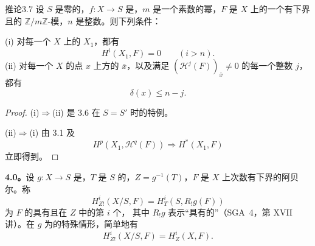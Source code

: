 \begin{SGAresult}{推论}{3.7}
设 $S$ 是零的，$f:X\to S$ 是，$m$ 是一个素数的幂，$F$ 是 $X$ 上的一个有下界且的 $\mathbb Z/m\mathbb Z$-模，$n$ 是整数。则下列条件：

(i) 对每一个 $X$ 上的 $X_1$，都有
\[
H^i(X_1,F)=0\qquad(i>n).
\]
(ii) 对每一个 $X$ 的点 $x$ 上方的 $\bar x$，以及满足 $(\mathcal H^j(F))_{\bar x}\ne0$ 的每一个整数 $j$，都有
\[
\delta(x)\leq n-j.
\]
\end{SGAresult}
\begin{proof}
(i)$\Rightarrow$(ii) 是 3.6 在 $S=S'$ 时的特例。

(ii)$\Rightarrow$(i) 由 3.1 及
\[
H^p(X_1,\mathcal H^q(F))\Longrightarrow H^*(X_1,F)
\]
立即得到。
\end{proof}

\textbf{4.0。}设 $g:X\to S$ 是，$T$ 是 $S$ 的，$Z=g^{-1}(T)$，$F$ 是 $X$ 上次数有下界的阿贝尔。称
\[
H^i_{Z!}(X/S,F)=H^i_T(S,R_!g(F))
\]
为 $F$ 的具有且在 $Z$ 中的第 $i$ 个，
其中 $R_!g$ 表示“具有的”（SGA~4，第 XVII 讲）。在 $g$ 为的特殊情形，简单地有
\[
H^i_{Z!}(X/S,F)=H^i_Z(X,F).
\]

